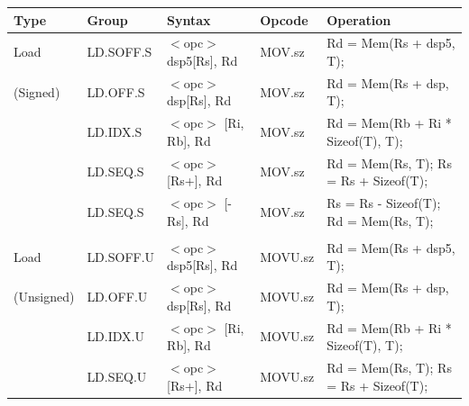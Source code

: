 \clearpage
\begin{table}
\begin{center}
\scriptsize
\begin{tabular}{lllll}
\hline
Type               & Group             & Syntax                                & Opcode            & Operation                                                                     \\ \hline
Load               & LD.SOFF.S         & $<$opc$>$ dsp5[Rs], Rd                & MOV.sz            & Rd = Mem(Rs + dsp5, T);                                                       \\
(Signed)           & LD.OFF.S          & $<$opc$>$ dsp[Rs], Rd                 & MOV.sz            & Rd = Mem(Rs + dsp, T);                                                        \\
                   & LD.IDX.S          & $<$opc$>$ [Ri, Rb], Rd                & MOV.sz            & Rd = Mem(Rb + Ri * Sizeof(T), T);                                             \\
                   & LD.SEQ.S          & $<$opc$>$ [Rs+], Rd                   & MOV.sz            & Rd = Mem(Rs, T); Rs = Rs + Sizeof(T);                                         \\
                   & LD.SEQ.S          & $<$opc$>$ [-Rs], Rd                   & MOV.sz            & Rs = Rs - Sizeof(T); Rd = Mem(Rs, T);                                         \\
                   &                   &                                       &                   &                                                                               \\
Load               & LD.SOFF.U         & $<$opc$>$ dsp5[Rs], Rd                & MOVU.sz           & Rd = Mem(Rs + dsp5, T);                                                       \\
(Unsigned)         & LD.OFF.U          & $<$opc$>$ dsp[Rs], Rd                 & MOVU.sz           & Rd = Mem(Rs + dsp, T);                                                        \\
                   & LD.IDX.U          & $<$opc$>$ [Ri, Rb], Rd                & MOVU.sz           & Rd = Mem(Rb + Ri * Sizeof(T), T);                                             \\
                   & LD.SEQ.U          & $<$opc$>$ [Rs+], Rd                   & MOVU.sz           & Rd = Mem(Rs, T); Rs = Rs + Sizeof(T);                                         \\

\end{tabular}
\end{center}
\end{table}
